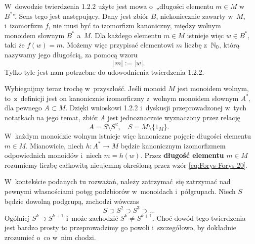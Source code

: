 \documentclass[a4paper,11pt]{article}
\begin{document}
\vspace{\spaceFour}





\start {} W~dowodzie twierdzenia 1.2.2 użyte jest mowa o~„długości
elementu $m \in M$ w~$B^{ * }$”. Sens tego jest następujący. Dany jest zbiór
$B$, niekoniecznie zawarty w~$M$, i~izomorfizm $f$, nie musi być to
izomorfizm kanoniczny, między wolnym monoidem słownym $B^{ * }$ a~$M$. Dla
każdego elementu $m \in M$ istnieje więc $w \in B^{ * }$, taki że $f( w ) = m$.
Możemy więc przypisać elementowi $m$ liczbę z~$\mathbb{N}_{ 0 }$, którą nazywamy
jego długością, za pomocą wzoru
\begin{equation}
  \label{eq:Forys-Forys-21}
  | m | := | w |.
\end{equation}
Tylko tyle jest nam potrzebne do udowodnienia twierdzenia 1.2.2.

Wybiegnijmy teraz trochę w~przyszłość. Jeśli monoid $M$ jest monoidem
wolnym, to~z~definicji jest on kanonicznie izomorficzny z~wolnym monoidem
słownym $A^{ * }$, dla pewnego $A \subset M$. Dzięki wnioskowi 1.2.2 i~dyskusji
przeprowadzonej w~tych notatkach na jego temat, zbiór $A$ jest jednoznacznie
wyznaczony przez relację
\begin{equation}
  \label{eq:Forys-Forys-22}
  A = S \setminus S^{ 2 }, \quad
  S = M \setminus \{ 1_{ M } \}.
\end{equation}
W~każdym monoidzie wolnym istnieje więc kanoniczne pojęcie długości
elementu $m \in M$. Mianowicie, niech $h : A^{ * } \to M$ będzie kanonicznym
izomorfizmem odpowiednich monoidów i~niech $m = h( w )$. Przez
\textbf{długość elementu $m \in M$} rozumiemy liczbę całkowitą nieujemną
określoną przez wzór \eqref{eq:Forys-Forys-20}.

\vspace{\spaceFour}





\start {} W~kontekście podanych tu rozważań, należy zatrzymać~się
zatrzymać nad pewnymi własnościami potęg podzbiorów w~monoidach
i~półgrupach. Niech $S$ będzie dowolną podgrupą, zachodzi wówczas
\begin{equation}
  \label{eq:Forys-Forys-23}
  S \supset S^{ 2 } \supset S^{ 3 } \supset \ldots
\end{equation}
Ogólniej $S^{ k } \supset S^{ k + 1 }$ i~może zachodzić $S^{ k } \neq S^{ k + 1 }$. Choć
dowód tego twierdzenia jest bardzo prosty to przeprowadzimy go powoli
i~szczegółowo, by dokładnie zrozumieć o~co w~nim chodzi.
\end{document}
